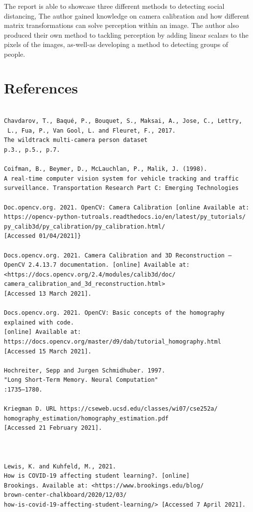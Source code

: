 \documentclass[12pt]{report}
\begin{document}
The report is able to showcase three different methods to detecting social distancing, The author gained knowledge on camera calibration and how different matrix transformations can solve perception within an image. The author also produced their own method to tackling perception by adding linear scalars to the pixels of the images, as-well-as developing a method to detecting groups of people. 

\chapter*{References}
\begin{verbatim}

Chavdarov, T., Baqué, P., Bouquet, S., Maksai, A., Jose, C., Lettry,
 L., Fua, P., Van Gool, L. and Fleuret, F., 2017.
The wildtrack multi-camera person dataset 
p.3., p.5., p.7. 

Coifman, B., Beymer, D., McLauchlan, P., Malik, J. (1998).
A real-time computer vision system for vehicle tracking and traffic 
surveillance. Transportation Research Part C: Emerging Technologies

Doc.opencv.org. 2021. OpenCV: Camera Calibration [online Available at:
https://opencv-python-tutroals.readthedocs.io/en/latest/py_tutorials/
py_calib3d/py_calibration/py_calibration.html/ 
[Accessed 01/04/2021]}

Docs.opencv.org. 2021. Camera Calibration and 3D Reconstruction — 
OpenCV 2.4.13.7 documentation. [online] Available at:
<https://docs.opencv.org/2.4/modules/calib3d/doc/
camera_calibration_and_3d_reconstruction.html>
[Accessed 13 March 2021].

Docs.opencv.org. 2021. OpenCV: Basic concepts of the homography 
explained with code. 
[online] Available at: 
https://docs.opencv.org/master/d9/dab/tutorial_homography.html
[Accessed 15 March 2021].

Hochreiter, Sepp and Jurgen Schmidhuber. 1997. 
"Long Short-Term Memory. Neural Computation" 
:1735–1780.

Kriegman D. URL https://cseweb.ucsd.edu/classes/wi07/cse252a/
homography_estimation/homography_estimation.pdf 
[Accessed 21 February 2021].



Lewis, K. and Kuhfeld, M., 2021. 
How is COVID-19 affecting student learning?. [online] 
Brookings. Available at: <https://www.brookings.edu/blog/
brown-center-chalkboard/2020/12/03/
how-is-covid-19-affecting-student-learning/> [Accessed 7 April 2021].


\end{verbatim}
\end{document}
